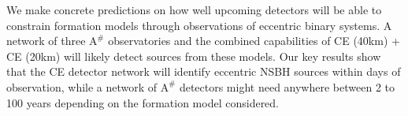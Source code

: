 We make concrete predictions on how well upcoming detectors will be able to constrain formation models through observations of eccentric binary systems. A network of three $\text{A}^{\#}$ observatories and the combined capabilities of CE (40km) + CE (20km) will likely detect sources from these models. Our key results show that the CE detector network will identify eccentric NSBH sources within days of observation, while a network of $\text{A}^{\#}$ detectors might need anywhere between 2 to 100 years depending on the formation model considered.

